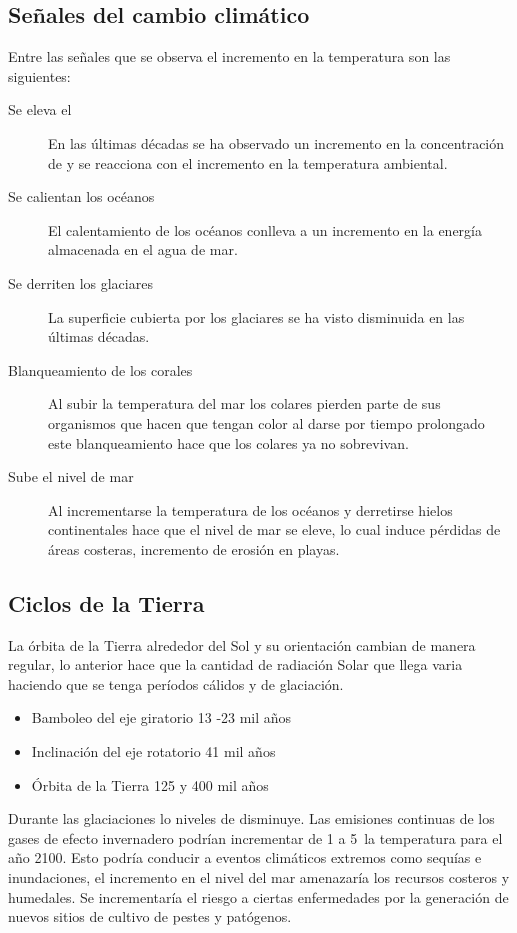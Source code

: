 \subsection{Señales del cambio climático}
Entre las señales que se observa el incremento en la temperatura son las siguientes:

\begin{description}
\item[Se eleva el ] En las últimas décadas se ha observado un incremento en la concentración de  y se reacciona con el incremento en la temperatura  ambiental.
\item[Se calientan los océanos]  El calentamiento de los océanos conlleva a un incremento en la energía almacenada en el  agua de mar. 
\item[Se derriten los glaciares ]  La superficie cubierta por los glaciares se ha visto disminuida en las últimas décadas.
\item[ Blanqueamiento de los corales] Al subir la temperatura del mar los colares pierden parte de sus organismos que hacen que tengan color al darse por tiempo prolongado este blanqueamiento hace que los colares ya no sobrevivan. 
\item[ Sube el nivel de mar]   Al incrementarse la temperatura de los océanos y derretirse hielos continentales hace que el nivel de mar se eleve, lo cual induce pérdidas de áreas costeras, incremento de erosión en playas.
\end{description}

\subsection{Ciclos de la Tierra}
La órbita de la Tierra alrededor del Sol y su orientación cambian de manera regular, lo anterior hace que la cantidad de radiación Solar que llega varia haciendo que se tenga períodos cálidos y de glaciación. 
\begin{itemize}
\item Bamboleo del eje giratorio 13 -23 mil años
\item Inclinación del eje rotatorio 41 mil años
\item Órbita de la Tierra 125 y 400 mil años 
\end{itemize}

Durante las glaciaciones lo niveles de  disminuye. 
Las emisiones continuas de los gases de efecto invernadero podrían incrementar de 1 a 5\celsius\, la temperatura para el año 2100. Esto podría conducir a eventos climáticos extremos como sequías e inundaciones, el incremento en el nivel  del mar amenazaría los recursos costeros y humedales. Se incrementaría el riesgo a ciertas enfermedades por la generación de nuevos sitios de cultivo de pestes y patógenos.

